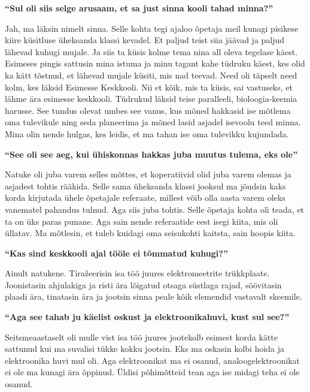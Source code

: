 \textbf{\enquote{Sul oli siis selge arusaam, et sa just sinna kooli tahad minna?}}

Jah, ma läksin nimelt sinna. Selle kohta tegi ajaloo õpetaja meil kunagi pisikese kiire küsitluse üheksanda klassi kevadel. Et paljud teist siia jäävad ja paljud lähevad kuhugi mujale. Ja siis ta küsis kolme tema nina all oleva tegelase käest. Esimeses pingis sattusin mina istuma ja minu tagant kahe tüdruku käest, kes olid ka kätt tõstnud, et lähevad mujale küsiti, mis nad teevad. Need oli täpselt need kolm, kes läksid Esimesse Keskkooli. Nii et kõik, mis ta küsis, sai vastuseks, et lähme ära esimesse keskkooli. Tüdrukud läksid teise paralleeli, bioloogia-keemia harusse. See tundus olevat umbes see vanus, kus mõned hakkasid ise mõtlema oma tulevikule ning seda planeerima ja mõned lasid asjadel isevoolu teed minna. Mina olin nende hulgas, kes leidis, et ma tahan ise oma tulevikku kujundada.

\textbf{\enquote{See oli see aeg, kui ühiskonnas hakkas juba muutus tulema, eks ole}}

Natuke oli juba varem selles mõttes, et koperatiivid olid juba varem olemas ja asjadest tohtis rääkida. Selle sama üheksanda klassi jooksul ma jõudsin kaks korda kirjutada ühele õpetajale referaate, millest võib olla aasta varem oleks vanematel pahandus tulnud. Aga siis juba tohtis. Selle õpetaja kohta oli teada, et ta on üks paras punane. Aga sain nende referaatide eest isegi kiita, mis oli üllatav. Ma mõtlesin, et tuleb kuidagi oma seisukohti kaitsta, sain hoopis kiita. 

\textbf{\enquote{Kas sind keskkooli ajal tööle ei tõmmatud kuhugi?}}

Ainult natukene. Tiražeerisin isa töö juures elektromeetrite trükkplaate. Joonistasin ahjulakiga ja risti ära lõigatud otsaga süstlaga rajad, söövitasin plaadi ära, tinatasin ära ja jootsin sinna peale kõik elemendid vastavalt skeemile. 

\textbf{\enquote{Aga see tahab ju käelist oskust ja elektroonikahuvi, kust sul see?}}

Seitsmeaastaselt oli mulle vist isa töö juures jootekolb esimest korda kätte sattunud kui ma suvalisi tükke kokku jootsin. Eks ma oskasin kolbi hoida ja elektroonika huvi mul oli. Aga elektroonikat ma ei osanud, analoogelektroonikat ei ole ma kunagi ära õppinud. Üldisi põhimõtteid tean aga ise midagi teha ei ole osanud.

